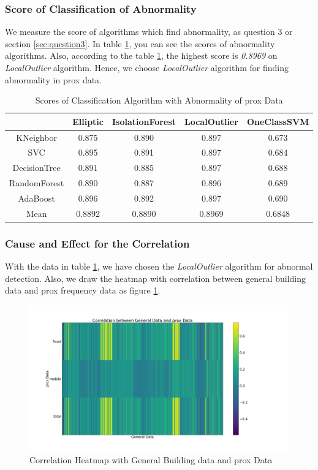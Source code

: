 \documentclass[aps, 10pt, a4paper]{article}
\begin{document}
            \subsubsection{Score of Classification of Abnormality}
                We measure the score of algorithms which find abnormality, as question 3 or section \ref{sec:question3}. In table \ref{tb:abnormalprox}, you can see the scores of abnormality algorithms. Also, according to the table \ref{tb:abnormalprox}, the highest score is \textit{0.8969} on \textit{LocalOutlier} algorithm. Hence, we choose \textit{LocalOutlier} algorithm for finding abnormality in prox data. 
                
                \begin{table}[htbp]
                    \centering
                    \caption{Scores of Classification Algorithm with Abnormality of prox Data}
                    \label{tb:abnormalprox}
                    \begin{tabular}{c|cccc}
                        & Elliptic & IsolationForest & LocalOutlier & OneClassSVM \\ \hline
                        KNeighbor & 0.875 & 0.890 & 0.897 & 0.673 \\
                        SVC & 0.895 & 0.891 & 0.897 & 0.684 \\
                        DecisionTree & 0.891 & 0.885 & 0.897 & 0.688 \\
                        RandomForest & 0.890 & 0.887 & 0.896 & 0.689 \\
                        AdaBoost & 0.896 & 0.892 & 0.897 & 0.690 \\ \hline
                        Mean & 0.8892 & 0.8890 & 0.8969 & 0.6848 \\
                    \end{tabular}
                \end{table}
            
            \subsubsection{Cause and Effect for the Correlation}
                With the data in table \ref{tb:abnormalprox}, we have chosen the \textit{LocalOutlier} algorithm for abnormal detection. Also, we draw the heatmap with correlation between general building data and prox frequency data as figure \ref{fig:correlationprox}.
                
                \begin{figure}[htbp]
                    \centering
                    \includegraphics[width=0.4 \linewidth]{figures/corrprox.png}
                    \caption{Correlation Heatmap with General Building data and prox Data}
                    \label{fig:correlationprox}
                \end{figure}
            
\end{document}
